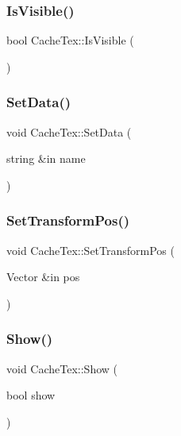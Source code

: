 \hypertarget{class_cache_tex_a343b3c50d82100c9ab449ca7826546a3}{}\label{class_cache_tex_a343b3c50d82100c9ab449ca7826546a3} 
\subsubsection{\texorpdfstring{Is\+Visible()}{IsVisible()}}
{\footnotesize\ttfamily bool Cache\+Tex\+::\+Is\+Visible (\begin{DoxyParamCaption}{ }\end{DoxyParamCaption})}

\hypertarget{class_cache_tex_ae47759d1324822fdeaeab4ae051c2feb}{}\label{class_cache_tex_ae47759d1324822fdeaeab4ae051c2feb} 
\subsubsection{\texorpdfstring{Set\+Data()}{SetData()}}
{\footnotesize\ttfamily void Cache\+Tex\+::\+Set\+Data (\begin{DoxyParamCaption}\item[{string \&in}]{name }\end{DoxyParamCaption})}

\hypertarget{class_cache_tex_a8d008a0e6540607f5aa1be2873dc89ea}{}\label{class_cache_tex_a8d008a0e6540607f5aa1be2873dc89ea} 
\subsubsection{\texorpdfstring{Set\+Transform\+Pos()}{SetTransformPos()}}
{\footnotesize\ttfamily void Cache\+Tex\+::\+Set\+Transform\+Pos (\begin{DoxyParamCaption}\item[{Vector \&in}]{pos }\end{DoxyParamCaption})}

\hypertarget{class_cache_tex_ad7d78ff9e77559cc4c0943f93d5bb762}{}\label{class_cache_tex_ad7d78ff9e77559cc4c0943f93d5bb762} 
\subsubsection{\texorpdfstring{Show()}{Show()}}
{\footnotesize\ttfamily void Cache\+Tex\+::\+Show (\begin{DoxyParamCaption}\item[{bool}]{show }\end{DoxyParamCaption})}

